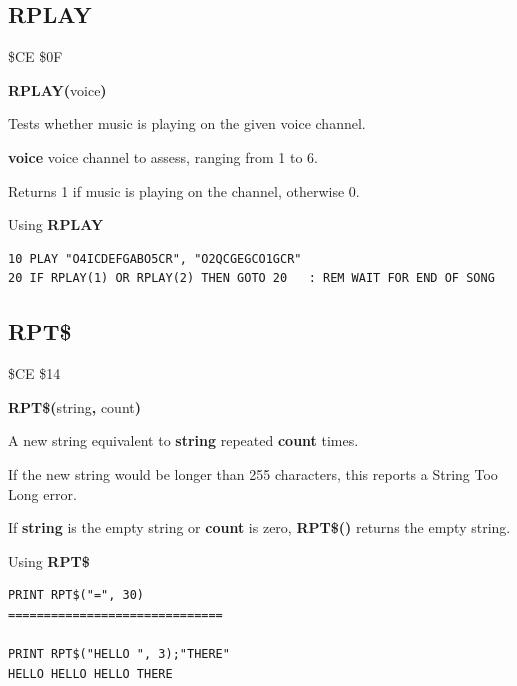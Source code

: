\subsection{RPLAY}
\begin{description}[leftmargin=2cm,style=nextline]
\item [Token:]    \$CE \$0F

\item [Format:]   {\bf RPLAY(}voice{\bf)}

\item [Returns:]  Tests whether music is playing on the given voice channel.

                  {\bf voice} voice channel to assess, ranging from 1 to 6.

                  Returns 1 if music is playing on the channel, otherwise 0.

\item [Example:]  Using {\bf RPLAY}

\begin{tcolorbox}[colback=black,coltext=white]
\verbatimfont{\codefont}
\begin{verbatim}
10 PLAY "O4ICDEFGABO5CR", "O2QCGEGCO1GCR"
20 IF RPLAY(1) OR RPLAY(2) THEN GOTO 20   : REM WAIT FOR END OF SONG
\end{verbatim}
\end{tcolorbox}
\end{description}


\newpage
\subsection{RPT\$}
\begin{description}[leftmargin=2cm,style=nextline]
\item [Token:]    \$CE \$14

\item [Format:]   {\bf RPT\$(}string{\bf,} count{\bf)}

\item [Returns:]  A new string equivalent to {\bf string} repeated {\bf count} times.

\item [Remarks:]  If the new string would be longer than 255 characters, this reports a String Too Long error.

                  If {\bf string} is the empty string or {\bf count} is zero, {\bf RPT\$()} returns the empty string.

\item [Example:]  Using {\bf RPT\$}

\begin{tcolorbox}[colback=black,coltext=white]
\verbatimfont{\codefont}
\begin{verbatim}
PRINT RPT$("=", 30)
==============================

PRINT RPT$("HELLO ", 3);"THERE"
HELLO HELLO HELLO THERE
\end{verbatim}
\end{tcolorbox}
\end{description}


